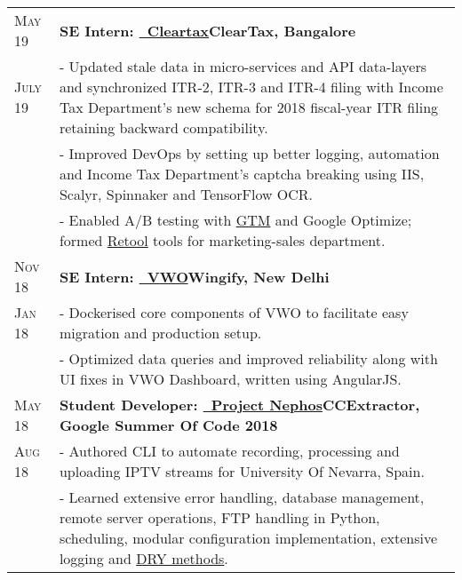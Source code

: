 \documentclass[a4paper,10pt]{extarticle} %
\begin{document}
\begin{tabularx}{\linewidth}{ l | X }

\textsc{May 19} & \textbf{SE Intern: {\href{https://cleartax.in/}{\ Cleartax}}}\hfill\textbf{ClearTax, Bangalore}\\
\textsc{July 19}& {- Updated stale data in micro-services and API data-layers and synchronized ITR-2, ITR-3 and ITR-4 filing with Income Tax Department's new schema for 2018 fiscal-year ITR filing retaining backward compatibility.}\\
& {- Improved DevOps by setting up better logging, automation and Income Tax Department's captcha breaking using IIS, Scalyr, Spinnaker and TensorFlow OCR.}\\
& {- Enabled A/B testing with \href{https://tagmanager.google.com/}{GTM} and Google Optimize; formed \href{https://tryretool.com/}{Retool} tools for marketing-sales department.}\\

\textsc{Nov 18} & \textbf{SE Intern: {\href{https://vwo.com/}{\ VWO}}}\hfill\textbf{Wingify, New Delhi}\\
\textsc{Jan 18}& {- Dockerised core components of VWO to facilitate easy migration and production setup.}\\
& {- Optimized data queries and improved reliability along with UI fixes in VWO Dashboard, written using AngularJS.}\\

\textsc{May 18} & \textbf{Student Developer: {\href{https://github.com/thealphadollar/Nephos}{\ Project Nephos}}}\hfill\textbf{CCExtractor, Google Summer Of Code 2018}\\
\textsc{Aug 18}& {- Authored CLI to automate recording, processing and uploading IPTV streams for University Of Nevarra, Spain.}\\
& {- Learned extensive error handling, database management, remote server operations, FTP handling in Python, scheduling, modular configuration implementation, extensive logging and \href{https://thealphadollar.github.io/learning/2019/05/13/go-dry.html}{DRY methods}.}\\

\end{tabularx}

\vspace{-0.1cm}
\end{document}
